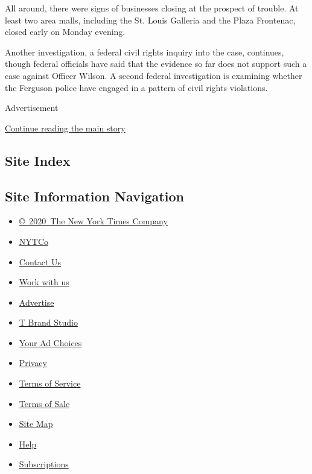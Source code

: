 All around, there were signs of businesses closing at the prospect of
trouble. At least two area malls, including the St. Louis Galleria and
the Plaza Frontenac, closed early on Monday evening.

Another investigation, a federal civil rights inquiry into the case,
continues, though federal officials have said that the evidence so far
does not support such a case against Officer Wilson. A second federal
investigation is examining whether the Ferguson police have engaged in a
pattern of civil rights violations.

Advertisement

\protect\hyperlink{after-bottom}{Continue reading the main story}

\hypertarget{site-index}{%
\subsection{Site Index}\label{site-index}}

\hypertarget{site-information-navigation}{%
\subsection{Site Information
Navigation}\label{site-information-navigation}}

\begin{itemize}
\tightlist
\item
  \href{https://help.nytimes.com/hc/en-us/articles/115014792127-Copyright-notice}{©~2020~The
  New York Times Company}
\end{itemize}

\begin{itemize}
\tightlist
\item
  \href{https://www.nytco.com/}{NYTCo}
\item
  \href{https://help.nytimes.com/hc/en-us/articles/115015385887-Contact-Us}{Contact
  Us}
\item
  \href{https://www.nytco.com/careers/}{Work with us}
\item
  \href{https://nytmediakit.com/}{Advertise}
\item
  \href{http://www.tbrandstudio.com/}{T Brand Studio}
\item
  \href{https://www.nytimes.com/privacy/cookie-policy\#how-do-i-manage-trackers}{Your
  Ad Choices}
\item
  \href{https://www.nytimes.com/privacy}{Privacy}
\item
  \href{https://help.nytimes.com/hc/en-us/articles/115014893428-Terms-of-service}{Terms
  of Service}
\item
  \href{https://help.nytimes.com/hc/en-us/articles/115014893968-Terms-of-sale}{Terms
  of Sale}
\item
  \href{https://spiderbites.nytimes.com}{Site Map}
\item
  \href{https://help.nytimes.com/hc/en-us}{Help}
\item
  \href{https://www.nytimes.com/subscription?campaignId=37WXW}{Subscriptions}
\end{itemize}

